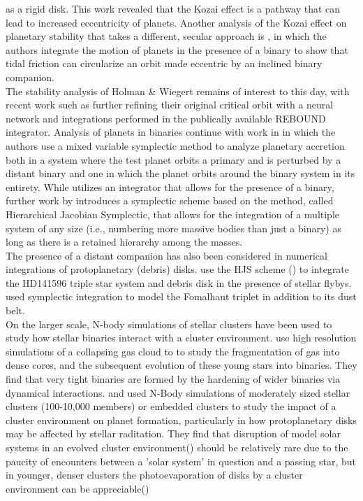 \documentclass{aastex631}
\begin{document}
as a rigid disk. This work revealed that the Kozai effect is a pathway that can lead to increased eccentricity of planets. Another analysis of the Kozai effect on planetary stability that 
takes a different, secular approach is \cite{fab07}, in which the authors integrate the motion of planets in the presence of a binary to show that tidal friction can circularize an 
orbit made eccentric by an inclined binary companion.\\
\indent The stability analysis of Holman \& Wiegert remains of interest to this day, with recent work such as \cite{lam18} further refining
their original critical orbit with a neural network and integrations performed in the publically available REBOUND integrator.
 Analysis of planets in binaries continue with work 
in \cite{cha02} in which the authors use a mixed variable symplectic method to analyze planetary accretion both in a system where the test planet orbits a primary and 
is perturbed by a distant binary and one in which the planet orbits around the binary system in its entirety. While \cite{cha02} utilizes an integrator that allows for the presence 
of a binary, further work by \cite{beu03} introduces a symplectic scheme based on the \cite{wis91} method, called Hierarchical Jacobian Symplectic, that allows for the 
integration of a multiple system of any size (i.e., numbering more massive bodies than just a binary) as long as there is a retained
hierarchy among the masses.  \\
The presence of a distant companion has also been considered in numerical integrations of protoplanetary (debris) disks. \cite{rec09} use the HJS scheme (\cite{beu03}) 
to integrate the HD141596 triple star system and debris disk in the presence of stellar flybys. 
\cite{beu14} used symplectic integration to model the Fomalhaut triplet in addition to its dust belt.  \\

\indent On the larger scale, N-body simulations of stellar clusters have been used to study how stellar binaries interact with a cluster environment. \cite{bat03} 
use high resolution simulations of a collapsing gas cloud to to study the fragmentation of gas into dense cores, 
and the subsequent evolution of these young stars into binaries. They find that very
 tight binaries are formed by the hardening of wider binaries via dynamical interactions. \cite{ada06} and \cite{pro09} used N-Body simulations of moderately sized stellar clusters
  (100-10,000 members) or embedded clusters to study the impact of a cluster environment on planet formation, particularly in how protoplanetary disks may be affected by stellar raditation.
  They find that disruption of model solar systems in an evolved cluster environment(\cite{ada06}) should be relatively rare due to the paucity of encounters between a 'solar system' 
  in question and a passing star, but in younger, denser clusters the photoevaporation of disks by a cluster environment can be appreciable(\cite{pro09})
  
\end{document}

